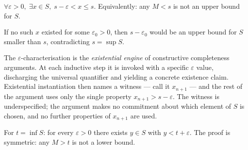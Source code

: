 \begin{remark}
$\forall\varepsilon>0,\;\exists x\in S,\;s-\varepsilon<x\leq s$.
Equivalently: any $M<s$ is not an upper bound for $S$.
\end{remark}

\begin{remark}
If no such $x$ existed for some $\varepsilon_0>0$, then $s-\varepsilon_0$
would be an upper bound for $S$ smaller than $s$, contradicting $s=\sup S$.
\end{remark}

\begin{remark}
The $\varepsilon$-characterisation is the \emph{existential engine} of
constructive completeness arguments. At each inductive step it is invoked
with a specific $\varepsilon$ value, discharging the universal quantifier
and yielding a concrete existence claim. Existential instantiation then
names a witness --- call it $x_{n+1}$ --- and the rest of the argument uses
only the single property $x_{n+1}>s-\varepsilon$. The witness is
underspecified; the argument makes no commitment about which element of $S$
is chosen, and no further properties of $x_{n+1}$ are used.
\end{remark}

\begin{remark}
For $t=\inf S$: for every $\varepsilon>0$ there exists $y\in S$ with
$y<t+\varepsilon$. The proof is symmetric: any $M>t$ is not a lower bound.
\end{remark}

